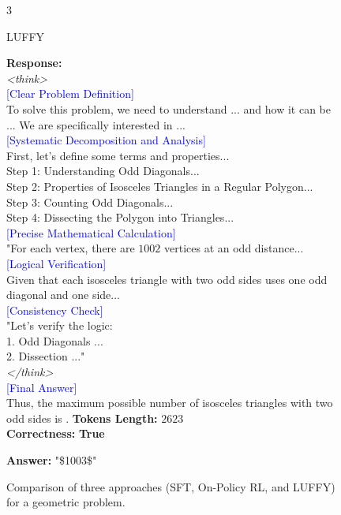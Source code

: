 \begin{figure}[h]
{\begin{tcolorbox}[center,breakable,title=\Large\centering{Case Study}]
\begin{multicols}{3}
\begin{center}
{\Large{LUFFY}}
\end{center}
\textcolor{my_green}{\textbf{Response:}}\\
\textit{<think>}\\
\textcolor{blue}{[Clear Problem Definition]}\\
To solve this problem, we need to understand ... and how it can be ... We are specifically interested in ...\\
\textcolor{blue}{[Systematic Decomposition and Analysis]}\\
First, let's define some terms and properties...\\
Step 1: Understanding Odd Diagonals... \\
Step 2: Properties of Isosceles Triangles in a Regular Polygon... \\
Step 3: Counting Odd Diagonals...\\
Step 4: Dissecting the Polygon into Triangles...\\
\textcolor{blue}{[Precise Mathematical Calculation]}\\
"For each vertex, there are \(1002\) vertices at an odd distance... \\
\textcolor{blue}{[Logical Verification]}\\
Given that each isosceles triangle with two odd sides uses one odd diagonal and one side... \\
\textcolor{blue}{[Consistency Check]}\\
"Let's verify the logic:\\ 1. Odd Diagonals ... \\2. Dissection ..." \\
\textit{</think>}\\
\textcolor{blue}{[Final Answer]}\\
Thus, the maximum possible number of isosceles triangles with two odd sides is .
\textcolor{my_purple}{\textbf{Tokens Length:}} $2623$\\
\textcolor{my_blue}{\textbf{Correctness:}} \textbf{True}
\columnbreak

\end{multicols}
\textbf{Answer:} "\$1003\$"
\end{tcolorbox}
}
\caption{Comparison of three approaches (SFT, On-Policy RL, and LUFFY) for a geometric problem.}
\label{fig:case}
\end{figure}


